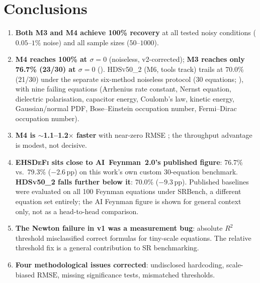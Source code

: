 \documentclass[twoside,11pt]{article}
\newcommand{\EHD}{\textsc{EHSDeFi}}
\newcommand{\HDS}{\textsc{HDSv50\_2}}
\newcommand{\Rsq}{R^{2}}
\newcommand{\rmse}{\ensuremath{\mathrm{RMSE}}}
\begin{document}
\section{Conclusions}
\label{sec:conclusions}

\begin{enumerate}
  \item \textbf{Both M3 and M4 achieve 100\% recovery} at all tested noisy
    conditions ($0.05$--$1\%$ noise) and all
    sample sizes ($50$--$1000$).
  \item \textbf{M4 reaches 100\% at $\sigma=0$} (noiseless, v2-corrected);
    \textbf{M3 reaches only 76.7\% (23/30) at $\sigma=0$}
    (). \HDS{} (M6, tools track) trails at 70.0\% (21/30)
    under the separate six-method noiseless protocol (30 equations;
    ), with nine failing equations (Arrhenius rate
    constant, Nernst equation, dielectric polarisation, capacitor energy,
    Coulomb's law, kinetic energy, Gaussian/normal PDF, Bose--Einstein
    occupation number, Fermi--Dirac occupation number).

  \item \textbf{M4 is $\sim$1.1--1.2$\times$ faster} with near-zero RMSE
    ; the throughput advantage is modest, not
    decisive.
  \item \textbf{\EHD{} sits close to AI~Feynman~2.0's published figure}:
    76.7\% vs.\ 79.3\% ($-2.6$\,pp) on this work's own custom 30-equation
    benchmark. \textbf{\HDS{} falls further below it}: 70.0\% ($-9.3$\,pp).
      Published baselines were evaluated on all 100
    Feynman equations under SRBench, a different equation set entirely;
    the AI Feynman figure is shown for general context only, not as a
    head-to-head comparison.
  \item \textbf{The Newton failure in v1 was a measurement bug}: absolute
    $\Rsq$ threshold misclassified correct formulas for tiny-scale equations.
    The relative threshold fix is a general contribution to SR benchmarking.
  \item \textbf{Four methodological issues corrected}: undisclosed hardcoding,
    scale-biased \rmse, missing significance tests, mismatched thresholds.
\end{enumerate}



\appendix
\end{document}
